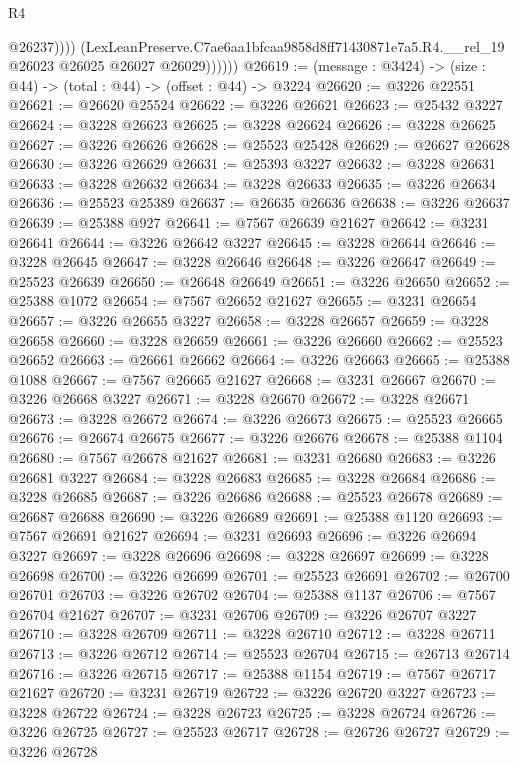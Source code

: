 \begin{lexlean}{R4}
\begin{coremodule}
                      @26237))))
              (LexLeanPreserve.C7ae6aa1bfcaa9858d8ff71430871e7a5.R4.__rel_19
                @26023
                @26025
                @26027
                @26029))))))
@26619 := (message : @3424) -> (size : @44) -> (total : @44) -> (offset : @44) -> @3224
@26620 := @3226 @22551
@26621 := @26620 @25524
@26622 := @3226 @26621
@26623 := @25432 @3227
@26624 := @3228 @26623
@26625 := @3228 @26624
@26626 := @3228 @26625
@26627 := @3226 @26626
@26628 := @25523 @25428
@26629 := @26627 @26628
@26630 := @3226 @26629
@26631 := @25393 @3227
@26632 := @3228 @26631
@26633 := @3228 @26632
@26634 := @3228 @26633
@26635 := @3226 @26634
@26636 := @25523 @25389
@26637 := @26635 @26636
@26638 := @3226 @26637
@26639 := @25388 @927
@26641 := @7567 @26639 @21627
@26642 := @3231 @26641
@26644 := @3226 @26642 @3227
@26645 := @3228 @26644
@26646 := @3228 @26645
@26647 := @3228 @26646
@26648 := @3226 @26647
@26649 := @25523 @26639
@26650 := @26648 @26649
@26651 := @3226 @26650
@26652 := @25388 @1072
@26654 := @7567 @26652 @21627
@26655 := @3231 @26654
@26657 := @3226 @26655 @3227
@26658 := @3228 @26657
@26659 := @3228 @26658
@26660 := @3228 @26659
@26661 := @3226 @26660
@26662 := @25523 @26652
@26663 := @26661 @26662
@26664 := @3226 @26663
@26665 := @25388 @1088
@26667 := @7567 @26665 @21627
@26668 := @3231 @26667
@26670 := @3226 @26668 @3227
@26671 := @3228 @26670
@26672 := @3228 @26671
@26673 := @3228 @26672
@26674 := @3226 @26673
@26675 := @25523 @26665
@26676 := @26674 @26675
@26677 := @3226 @26676
@26678 := @25388 @1104
@26680 := @7567 @26678 @21627
@26681 := @3231 @26680
@26683 := @3226 @26681 @3227
@26684 := @3228 @26683
@26685 := @3228 @26684
@26686 := @3228 @26685
@26687 := @3226 @26686
@26688 := @25523 @26678
@26689 := @26687 @26688
@26690 := @3226 @26689
@26691 := @25388 @1120
@26693 := @7567 @26691 @21627
@26694 := @3231 @26693
@26696 := @3226 @26694 @3227
@26697 := @3228 @26696
@26698 := @3228 @26697
@26699 := @3228 @26698
@26700 := @3226 @26699
@26701 := @25523 @26691
@26702 := @26700 @26701
@26703 := @3226 @26702
@26704 := @25388 @1137
@26706 := @7567 @26704 @21627
@26707 := @3231 @26706
@26709 := @3226 @26707 @3227
@26710 := @3228 @26709
@26711 := @3228 @26710
@26712 := @3228 @26711
@26713 := @3226 @26712
@26714 := @25523 @26704
@26715 := @26713 @26714
@26716 := @3226 @26715
@26717 := @25388 @1154
@26719 := @7567 @26717 @21627
@26720 := @3231 @26719
@26722 := @3226 @26720 @3227
@26723 := @3228 @26722
@26724 := @3228 @26723
@26725 := @3228 @26724
@26726 := @3226 @26725
@26727 := @25523 @26717
@26728 := @26726 @26727
@26729 := @3226 @26728

\end{coremodule}
\end{lexlean}
